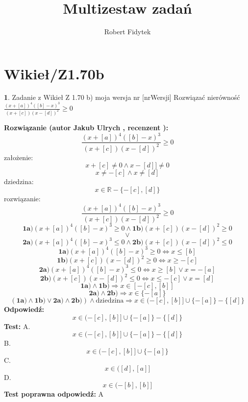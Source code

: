 \documentclass[12pt, a4paper]{article}
\title{Multizestaw zadań}
\author{Robert Fidytek}
\date{}
\theoremstyle{definition} %
\newtheorem{zad}{}
\newcommand{\kategoria}[1]{\section{#1}} %
\newcommand{\zadStart}[1]{\begin{zad}#1\newline} %
\newcommand{\zadStop}{\end{zad}}   %
\newcommand{\rozwStart}[2]{\noindent \textbf{Rozwiązanie (autor #1 , recenzent #2): }\newline} %
\newcommand{\rozwStop}{\newline}                                            %
\newcommand{\odpStart}{\noindent \textbf{Odpowiedź:}\newline}    %
\newcommand{\odpStop}{\newline}                                             %
\newcommand{\testStart}{\noindent \textbf{Test:}\newline} %
\newcommand{\testStop}{\newline} %
\newcommand{\kluczStart}{\noindent \textbf{Test poprawna odpowiedź:}\newline} %
\newcommand{\kluczStop}{\newline} %
\begin{document}
\maketitle


\kategoria{Wikieł/Z1.70b}
\zadStart{Zadanie z Wikieł Z 1.70 b) moja wersja nr [nrWersji]}
Rozwiązać nierówność $\frac{(x+[a])^{4}([b]-x)^{3}}{(x+[c])(x-[d])^{2}}\geq0$
\zadStop
\rozwStart{Jakub Ulrych}{}
$$\frac{(x+[a])^{4}([b]-x)^{3}}{(x+[c])(x-[d])^{2}}\geq0$$
założenie: $$x+[c]\neq0\land x-[d]]\neq0$$
$$x\neq-[c]\land x\neq[d]$$
dziedzina:$$x\in \mathbb{R}-\{-[c],[d]\}$$
rozwiązanie:$$\frac{(x+[a])^{4}([b]-x)^{3}}{(x+[c])(x-[d])^{2}}\geq0$$
$$\textbf{1a)}(x+[a])^{4}([b]-x)^{3}\geq0 \land \textbf{1b)}(x+[c])(x-[d])^{2}\geq0$$ $$\vee$$ $$\textbf{2a)}(x+[a])^{4}([b]-x)^{3}\leq0 \land \textbf{2b)}(x+[c])(x-[d])^{2}\leq0$$
$$\textbf{1a)}(x+[a])^{4}([b]-x)^{3}\geq0\Leftrightarrow x\leq[b]$$
$$\textbf{1b)}(x+[c])(x-[d])^{2}\geq0\Leftrightarrow x\geq-[c]$$
$$\textbf{2a)}(x+[a])^{4}([b]-x)^{3}\leq0\Leftrightarrow x\geq[b] \vee x=-[a]$$
$$\textbf{2b)}(x+[c])(x-[d])^{2}\leq0\Leftrightarrow x\leq-[c]\vee x=[d]$$
$$\textbf{1a)}\land\textbf{1b)}\Rightarrow x\in[-[c],[b]]$$
$$\textbf{2a)}\land\textbf{2b)}\Rightarrow x\in\{-[a]\}$$
$$(\textbf{1a)}\land\textbf{1b)}\vee\textbf{2a)}\land\textbf{2b)})\land \text{dziedzina}\Rightarrow x\in(-[c],[b]]\cup\{-[a]\}-\{[d]\}$$
\rozwStop
\odpStart
$$x\in(-[c],[b]]\cup\{-[a]\}-\{[d]\}$$
\odpStop
\testStart
A.$$x\in(-[c],[b]]\cup\{-[a]\}-\{[d]\}$$
B.$$x\in(-[c],[b]]\cup\{-[a]\}$$
C.$$x\in([d],[a]]$$
D.$$x\in(-[b],[b]]$$
\testStop
\kluczStart
A
\kluczStop
\end{document}
